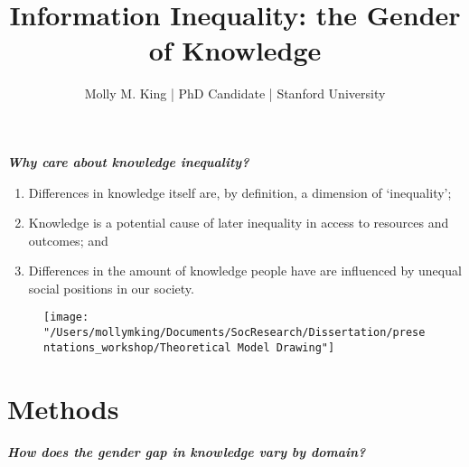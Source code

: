 \documentclass[]{article}
\begin{document}
 \title{\vspace{-1.0cm}Information Inequality: the Gender of Knowledge}
 \date{}
 \author{Molly M. King  |  PhD Candidate  |  Stanford University}

 \maketitle
\thispagestyle{fancy}

\emph{\textbf{Why care about knowledge inequality?}}

\begin{enumerate}
  \item{Differences in knowledge itself are, by definition, a dimension of `inequality';}
  \item{Knowledge is a potential cause of later inequality in access to resources and outcomes; and}
  \item{Differences in the amount of knowledge people have are influenced by unequal social positions in our society.}
\end{enumerate}


    \begin{figure}[htb]
      \begin{center}
        \texttt{[image: "/Users/mollymking/Documents/SocResearch/Dissertation/presentations\_workshop/Theoretical Model Drawing"]}
      \end{center}
    \end{figure}


\section{Methods}\label{methods}

\emph{\textbf{How does the gender gap in knowledge vary by domain?}}

\vspace{10mm}
\end{document}
